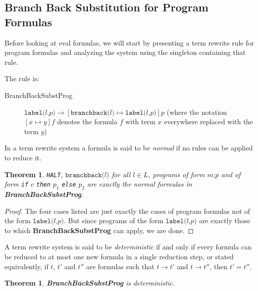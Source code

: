 \documentclass[11pt]{article}
\begin{document}
\subsection{Branch Back Substitution for Program Formulas}

Before looking at eval formulas, we will start by presenting a term rewrite rule for program formulas and analyzing the system using the singleton containing that rule.

The rule is:

\begin{description}
\item[BranchBackSubstProg] $\texttt{label(}l\texttt{,} p\texttt{)} \longrightarrow [\texttt{branchback(}l\texttt{)} \mapsto \texttt{label(}l\texttt{,} p\texttt{)}]p$ (where the notation $[x \mapsto y]f$ denotes the formula $f$ with term $x$ everywhere replaced with the term $y$)
\end{description}

In a term rewrite system a formula is said to be \emph{normal} if no rules can be applied to reduce it.

\newtheorem*{branchbacksubstnormals}{Theorem}
\begin{branchbacksubstnormals}
\texttt{HALT}, $\texttt{branchback(}l\texttt{)}$ for all $l \in L$, programs of form $m\texttt{;}p$ and of form \texttt{if} $c$ \texttt{then} $p_{1}$ \texttt{else} $p_{2}$ are exactly the normal formulas in \textbf{BranchBackSubstProg}.
\end{branchbacksubstnormals}

\begin{proof}
The four cases listed are just exactly the cases of program formulas not of the form $\texttt{label(}l\texttt{,} p\texttt{)}$.  But since programs of the form $\texttt{label(}l\texttt{,} p\texttt{)}$ are exactly those to which \textbf{BranchBackSubstProg} can apply, we are done.
\end{proof}

A term rewrite system is said to be \emph{deterministic} if and only if every formula can be reduced to at most one new formula in a single reduction step, or stated equivalently, if $t$, $t'$ and $t''$ are formulas such that $t \rightarrow t'$ and $t \rightarrow t''$, then $t' = t''$.

\newtheorem*{branchbacksubstisdeterministic}{Theorem}
\begin{branchbacksubstisdeterministic}
\textbf{BranchBackSubstProg} is deterministic.
\end{branchbacksubstisdeterministic}
\end{document}
